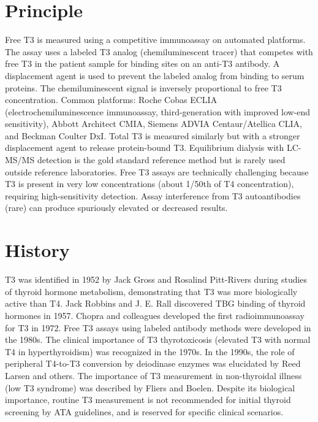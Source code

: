 \section*{Principle}
Free T3 is measured using a competitive immunoassay on automated platforms. The assay uses a labeled T3 analog (chemiluminescent tracer) that competes with free T3 in the patient sample for binding sites on an anti-T3 antibody. A displacement agent is used to prevent the labeled analog from binding to serum proteins. The chemiluminescent signal is inversely proportional to free T3 concentration. Common platforms: Roche Cobas ECLIA (electrochemiluminescence immunoassay, third-generation with improved low-end sensitivity), Abbott Architect CMIA, Siemens ADVIA Centaur/Atellica CLIA, and Beckman Coulter DxI. Total T3 is measured similarly but with a stronger displacement agent to release protein-bound T3. Equilibrium dialysis with LC-MS/MS detection is the gold standard reference method but is rarely used outside reference laboratories. Free T3 assays are technically challenging because T3 is present in very low concentrations (about 1/50th of T4 concentration), requiring high-sensitivity detection. Assay interference from T3 autoantibodies (rare) can produce spuriously elevated or decreased results.

\section*{History}
T3 was identified in 1952 by Jack Gross and Rosalind Pitt-Rivers during studies of thyroid hormone metabolism, demonstrating that T3 was more biologically active than T4. Jack Robbins and J. E. Rall discovered TBG binding of thyroid hormones in 1957. Chopra and colleagues developed the first radioimmunoassay for T3 in 1972. Free T3 assays using labeled antibody methods were developed in the 1980s. The clinical importance of T3 thyrotoxicosis (elevated T3 with normal T4 in hyperthyroidism) was recognized in the 1970s. In the 1990s, the role of peripheral T4-to-T3 conversion by deiodinase enzymes was elucidated by Reed Larsen and others. The importance of T3 measurement in non-thyroidal illness (low T3 syndrome) was described by Fliers and Boelen. Despite its biological importance, routine T3 measurement is not recommended for initial thyroid screening by ATA guidelines, and is reserved for specific clinical scenarios.

